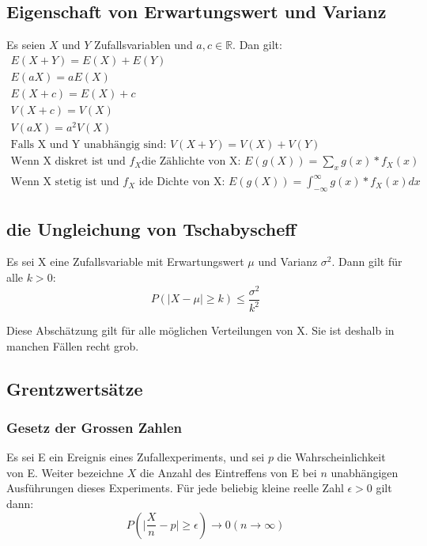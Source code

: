 \documentclass[10pt]{article}
\newtheorem[M]{definition}{Def.}
\newtheorem[M]{satz}{Satz}
\numberwithin{equation}{section}
\newcommand{\RN}{\mathbb{R}} %
\begin{document}
\subsection{Eigenschaft von Erwartungswert und Varianz}
Es seien $X$ und $Y$  Zufallsvariablen und $a, c \in \RN$.
Dan gilt:
\begin{align}
E(X + Y) = E(X) + E(Y) \\
E(aX) = aE(X) \\
E(X + c) = E(X) + c\\
V(X + c) = V(X)\\
V(aX) = a^2V(X)\\
\text{Falls X und Y unabhängig sind: } V(X + Y) = V(X) + V(Y) \\
\text{Wenn X diskret ist und } f_X \text{die Zählichte von X: } E(g(X)) = \sum_x g(x) * f_X(x) \\
\text{Wenn X stetig ist und } f_X \text{ ide Dichte von X: } E(g(X)) = \int_{-\infty}^\infty g(x) * f_X(x) dx
\end{align}

\subsection{die Ungleichung von Tschabyscheff}
\begin{satz}
Es sei X eine Zufallsvariable mit Erwartungswert $\mu$ und Varianz $\sigma^2$. Dann gilt für alle $k > 0$:
\begin{equation}
P(\mid X - \mu \mid \geq k) \leq \frac{\sigma^2}{k^2}
\end{equation}
\end{satz}
Diese Abschätzung gilt für alle möglichen Verteilungen von X. Sie ist deshalb in manchen Fällen recht grob.

\subsection{Grentzwertsätze}
\subsubsection{Gesetz der Grossen Zahlen}
Es sei E ein Ereignis eines Zufallexperiments, und sei $p$ die Wahrscheinlichkeit von E. Weiter bezeichne $X$ die Anzahl des Eintreffens von E bei $n$ unabhängigen Ausführungen dieses Experiments. Für jede beliebig kleine reelle Zahl $\epsilon > 0$ gilt dann:
\begin{equation}
P(\mid \frac{X}{n} - p \mid \geq \epsilon) \rightarrow 0 (n \rightarrow \infty)
\end{equation}
\end{document}
